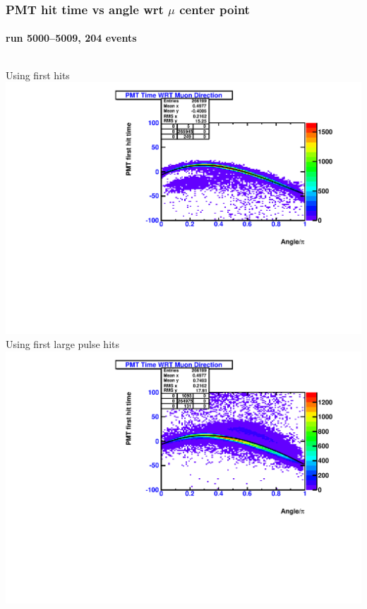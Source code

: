 \documentclass{beamer}
\begin{document}
\begin{frame}
	\frametitle{PMT hit time vs angle wrt $\mu$ center point}
	\framesubtitle{run \numrange{5000}{5009}, 204 events}
	\begin{columns}[t]
		Using first hits
		\includegraphics[width=1.0\textwidth]{analyzed_rtq_atm_mu_run005000_test_hitTimePositions_includeEarlyLateHits.pdf}
		Using first large pulse hits
		\includegraphics[width=1.0\textwidth]{analyzed_rtq_atm_mu_run005000_multiPulse_test_hitTimePositions_includeEarlyLateHits.pdf}
	\end{columns}
\end{frame}
\end{document}
